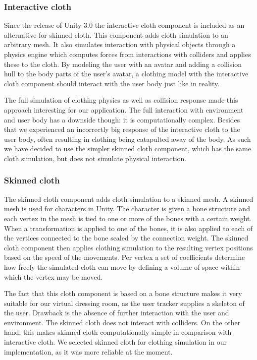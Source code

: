 \documentclass[twocolumn,a4paper]{article}
\begin{document}
\subsubsection{Interactive cloth}
\label{sec:interactive_cloth}	
Since the release of Unity 3.0 the interactive cloth component is included as an alternative for skinned cloth. This component adds cloth simulation to an arbitrary mesh. It also simulates interaction with physical objects through a physics engine which computes forces from interactions with colliders and applies these to the cloth. By modeling the user with an avatar and adding a collision hull to the body parts of the user's avatar, a clothing model with the interactive cloth component should interact with the user body just like in reality.

The full simulation of clothing physics as well as collision response made this approach interesting for our application. The full interaction with environment and user body has a downside though: it is computationally complex. Besides that we experienced an incorrectly big response of the interactive cloth to the user body, often resulting in clothing being catapulted away of the body. As such we have decided to use the simpler skinned cloth component, which has the same cloth simulation, but does not simulate physical interaction.
	 	
\subsubsection{Skinned cloth}
\label{sec:skinned_cloth}
	 	
The skinned cloth component adds cloth simulation to a skinned mesh. A skinned mesh is used for characters in Unity. The character is given a bone structure and each vertex in the mesh is tied to one or more of the bones with a certain weight. When a transformation is applied to one of the bones, it is also applied to each of the vertices connected to the bone scaled by the connection weight. The skinned cloth component then applies clothing simulation to the resulting vertex positions based on the speed of the movements. Per vertex a set of coefficients determine how freely the simulated cloth can move by defining a volume of space within which the vertex may be moved.

The fact that this cloth component is based on a bone structure makes it very suitable for our virtual dressing room, as the user tracker supplies a skeleton of the user. Drawback is the absence of further interaction with the user and environment. The skinned cloth does not interact with colliders. On the other hand, this makes skinned cloth computationally simple in comparison with interactive cloth. We selected skinned cloth for clothing simulation in our implementation, as it was more reliable at the moment.
\end{document}
